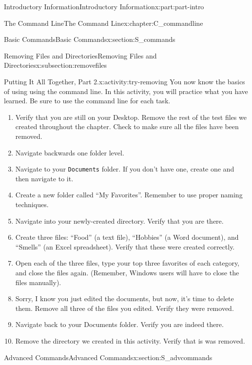 \documentclass[oneside,10pt,]{book}
\newcommand{\mono}[1]{\texttt{#1}}
\begin{document}
\begin{partptx}{Introductory Information}{}{Introductory Information}{}{}{x:part:part-intro}
\begin{chapterptx}{The Command Line}{}{The Command Line}{}{}{x:chapter:C_commandline}
\begin{sectionptx}{Basic Commands}{}{Basic Commands}{}{}{x:section:S_commands}
\begin{subsectionptx}{Removing Files and Directories}{}{Removing Files and Directories}{}{}{x:subsection:removefiles}
\begin{activity}{Putting It All Together, Part 2.}{x:activity:try-removing}%
%
You now know the basics of using using the command line. In this activity, you will practice what you have learned. Be sure to use the command line for each task.%
\begin{enumerate}[font=\bfseries,label=(\alph*),ref=\alph*]
\item{}Verify that you are still on your Desktop. Remove the rest of the test files we created throughout the chapter. Check to make sure all the files have been removed.%
\item{}Navigate backwards one folder level.%
\item{}Navigate to your \mono{Documents} folder. If you don't have one, create one and then navigate to it.%
\item{}Create a new folder called ``My Favorites''. Remember to use proper naming techniques.%
\item{}Navigate into your newly-created directory. Verify that you are there.%
\item{}Create three files: ``Food'' (a text file), ``Hobbies'' (a Word document), and ``Smells'' (an Excel spreadsheet). Verify that these were created correctly.%
\item{}Open each of the three files, type your top three favorites of each category, and close the files again. (Remember, Windows users will have to close the files manually).%
\item{}Sorry, I know you just edited the documents, but now, it's time to delete them. Remove all three of the files you edited. Verify they were removed.%
\item{}Navigate back to your Documents folder. Verify you are indeed there.%
\item{}Remove the directory we created in this activity. Verify that is was removed.%
\end{enumerate}
\end{activity}%
\end{subsectionptx}
\end{sectionptx}
%
%
\typeout{************************************************}
\typeout{************************************************}
%
\begin{sectionptx}{Advanced Commands}{}{Advanced Commands}{}{}{x:section:S_advcommands}
%
%
%
\begin{introduction}{}%

\end{introduction}
\end{sectionptx}
\end{chapterptx}
\end{partptx}
\end{document}
